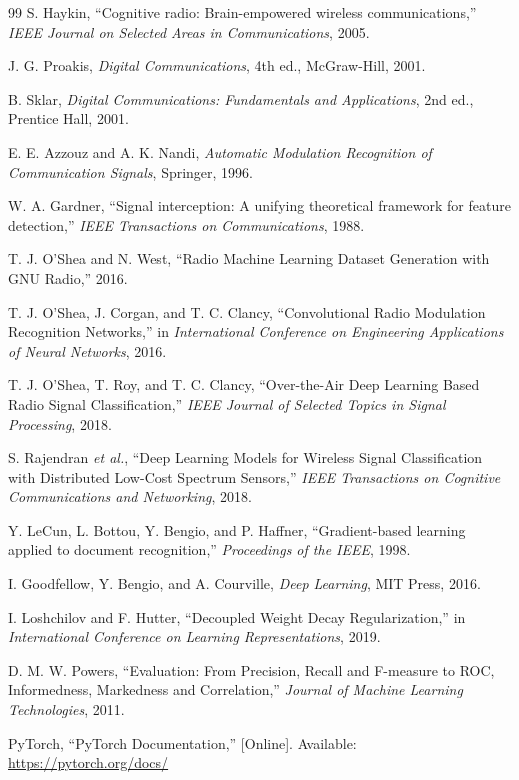 \documentclass[12pt,a4paper]{report}
\begin{document}
\begin{thebibliography}{99}
S. Haykin, ``Cognitive radio: Brain-empowered wireless communications,'' \textit{IEEE Journal on Selected Areas in Communications}, 2005.

J. G. Proakis, \textit{Digital Communications}, 4th ed., McGraw-Hill, 2001.

B. Sklar, \textit{Digital Communications: Fundamentals and Applications}, 2nd ed., Prentice Hall, 2001.

E. E. Azzouz and A. K. Nandi, \textit{Automatic Modulation Recognition of Communication Signals}, Springer, 1996.

W. A. Gardner, ``Signal interception: A unifying theoretical framework for feature detection,'' \textit{IEEE Transactions on Communications}, 1988.

T. J. O’Shea and N. West, ``Radio Machine Learning Dataset Generation with GNU Radio,'' 2016.

T. J. O’Shea, J. Corgan, and T. C. Clancy, ``Convolutional Radio Modulation Recognition Networks,'' in \textit{International Conference on Engineering Applications of Neural Networks}, 2016.

T. J. O’Shea, T. Roy, and T. C. Clancy, ``Over-the-Air Deep Learning Based Radio Signal Classification,'' \textit{IEEE Journal of Selected Topics in Signal Processing}, 2018.

S. Rajendran \textit{et al.}, ``Deep Learning Models for Wireless Signal Classification with Distributed Low-Cost Spectrum Sensors,'' \textit{IEEE Transactions on Cognitive Communications and Networking}, 2018.

Y. LeCun, L. Bottou, Y. Bengio, and P. Haffner, ``Gradient-based learning applied to document recognition,'' \textit{Proceedings of the IEEE}, 1998.

I. Goodfellow, Y. Bengio, and A. Courville, \textit{Deep Learning}, MIT Press, 2016.

I. Loshchilov and F. Hutter, ``Decoupled Weight Decay Regularization,'' in \textit{International Conference on Learning Representations}, 2019.

D. M. W. Powers, ``Evaluation: From Precision, Recall and F-measure to ROC, Informedness, Markedness and Correlation,'' \textit{Journal of Machine Learning Technologies}, 2011.

PyTorch, ``PyTorch Documentation,'' [Online]. Available: \url{https://pytorch.org/docs/}
\end{thebibliography}
\end{document}

